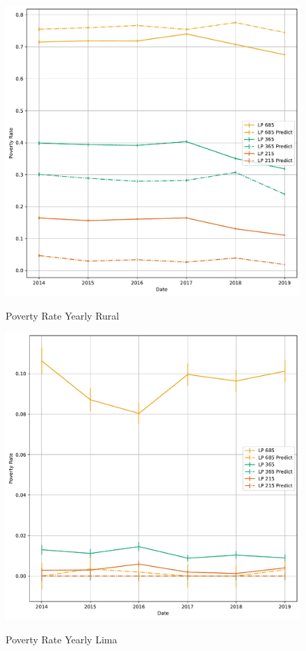 \begin{figure}[H]
    \centering
    \caption{Poverty Rate Yearly Rural}
    \includegraphics[width=\textwidth]{../figures/fig8b_poverty_rate_time_series_rural.pdf}
    \label{fig:enter-label}
\end{figure}


\begin{figure}[H]
    \centering
    \caption{Poverty Rate Yearly Lima}
    \includegraphics[width=\textwidth]{../figures/fig8c_poverty_rate_time_series_lima.pdf}
    \label{fig:enter-label}
\end{figure}


